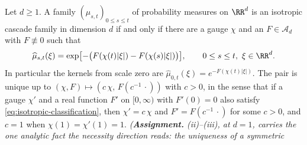 \begin{theorem}
\label{thm:isotropic-classification}
\leanok
Let $d \ge 1$. A family $(\mu_{s,t})_{0 \le s \le t}$ of probability measures on $\RR^d$ is an
isotropic cascade family in dimension $d$ if and only if there are a gauge $\chi$ and an
$F \in \mathcal{A}_d$ with $F \not\equiv 0$ such that
\begin{equation}\label{eq:isotropic-classification}
  \widehat\mu_{s,t}(\xi) = \exp\bigl[-\bigl(F(\chi(t)|\xi|) - F(\chi(s)|\xi|)\bigr)\bigr],
  \qquad 0 \le s \le t,\ \xi \in \RR^d .
\end{equation}
In particular the kernels from scale zero are $\widehat\mu_{0,t}(\xi) = e^{-F(\chi(t)|\xi|)}$. The
pair is unique up to $(\chi,F) \mapsto (c\,\chi,\,F(c^{-1}\,\cdot))$ with $c > 0$, in the sense that if a gauge $\chi'$
and a real function $F'$ on $[0,\infty)$ with $F'(0) = 0$ also satisfy
\ref{eq:isotropic-classification}, then
$\chi' = c\,\chi$ and $F' = F(c^{-1}\,\cdot)$ for some $c > 0$, and $c = 1$ when
$\chi(1) = \chi'(1) = 1$.
\statusA\quad{}\quad\emph{(\textbf{Assignment.} (ii)--(iii), at $d = 1$,
carries the one analytic fact the necessity direction reads: the uniqueness of a symmetric \Levy{}
}
\end{theorem}

